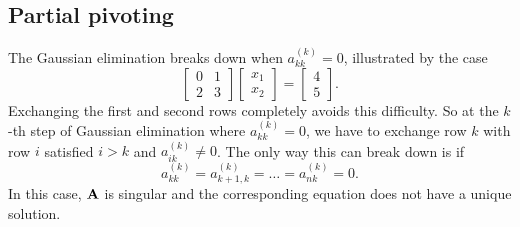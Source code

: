 \subsection{Partial pivoting}
\begin{exm}
    The Gaussian elimination breaks down when $a_{kk}^{(k)}=0$, 
    illustrated by the case
    $$
        \begin{bmatrix}
            0&1\\2&3
        \end{bmatrix}
        \begin{bmatrix}
            x_1\\x_2
        \end{bmatrix}=
        \begin{bmatrix}
            4\\5
        \end{bmatrix}.
    $$ 
    Exchanging the first and second rows completely avoids 
    this difficulty. So at the $k$-th step of Gaussian 
    elimination where $a_{kk}^{(k)}=0$, we have to exchange 
    row $k$ with row $i$ satisfied $i>k$ and $a_{ik}^{(k)}
    \neq 0$. The only way this can break down is if 
    $$
        a_{kk}^{(k)}=a_{k+1,k}^{(k)}=\ldots=a_{nk}^{(k)}=0.
    $$ 
    In this case, ${\mathbf{A}}$ is singular and the corresponding 
    equation does not have a unique solution.
\end{exm}

